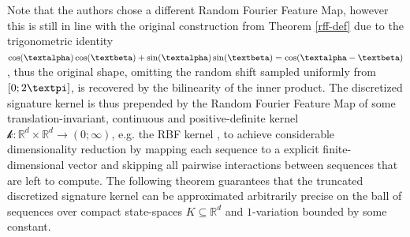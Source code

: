 \documentclass[openany]{book}
\begin{document}
Note that the authors chose a different Random Fourier Feature Map, however this is still in line with the original construction from Theorem \ref{rff-def} due to the trigonometric identity $\cos(\galpha)\cos(\gbeta)+\sin(\galpha)\sin(\gbeta)=\cos(\galpha - \gbeta)$, thus the original shape, omitting the random shift sampled uniformly from $[0;2\gpi]$, is recovered by the bilinearity of the inner product. The discretized signature kernel is thus prepended by the Random Fourier Feature Map of some translation-invariant, continuous and positive-definite kernel $\mathscr k:\mathbb R^d\times \mathbb R^d\to (0;\infty)$, e.g. the RBF kernel \cite{toth2025}, to achieve considerable dimensionality reduction by mapping each sequence to a explicit finite-dimensional vector and skipping all pairwise interactions between sequences that are left to compute.
The following theorem guarantees that the truncated discretized signature kernel can be approximated arbitrarily precise on the ball of sequences over compact state-spaces $K\subseteq \mathbb R^d$ and $1$-variation bounded by some constant.
\end{document}
